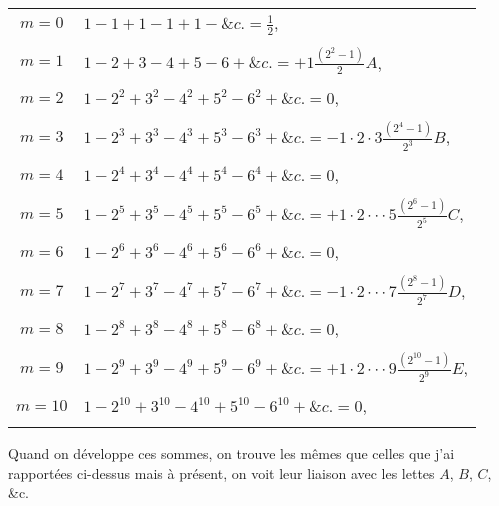 \documentclass[12pt]{article}
\theoremstyle{definition}
\begin{document}
\begin{center}
\begin{tabular}{ c|l }
$m=0$ & $1 - 1 + 1 - 1 + 1 - \&c. = \frac{1}{2}$, \\ & \\
$m=1$ & $1 - 2 + 3 - 4 + 5 - 6 + \&c. = +1\frac{(2^2 - 1)}{2}A$, \\ & \\
$m=2$ & $1 - 2^2 + 3^2 - 4^2 + 5^2 - 6^2 + \&c. = 0$, \\ & \\
$m=3$ & $1 - 2^3 + 3^3 - 4^3 + 5^3 - 6^3 + \&c. = -1\cdot 2 \cdot 3\frac{(2^4 - 1)}{2^3}B$, \\ & \\
$m=4$ & $1 - 2^4 + 3^4 - 4^4 + 5^4 - 6^4 + \&c. = 0$, \\ & \\
$m=5$ & $1 - 2^5 + 3^5 - 4^5 + 5^5 - 6^5 + \&c. = +1\cdot 2 \cdot \cdot \cdot 5\frac{(2^6 - 1)}{2^5}C$, \\ & \\
$m=6$ & $1 - 2^6 + 3^6 - 4^6 + 5^6 - 6^6 + \&c. = 0$, \\ & \\
$m=7$ & $1 - 2^7 + 3^7 - 4^7 + 5^7 - 6^7 + \&c. = -1\cdot 2 \cdot \cdot \cdot 7\frac{(2^8 - 1)}{2^7}D$, \\ & \\
$m=8$ & $1 - 2^8 + 3^8 - 4^8 + 5^8 - 6^8 + \&c. = 0$, \\ & \\
$m=9$ & $1 - 2^9 + 3^9 - 4^9 + 5^9 - 6^9 + \&c. = +1\cdot 2 \cdot \cdot \cdot 9\frac{(2^{10} - 1)}{2^9}E$, \\ & \\
$m=10$ & $1 - 2^{10} + 3^{10} - 4^{10} + 5^{10} - 6^{10} + \&c. = 0$, \\ & \\
\end{tabular}
\end{center}
Quand on développe ces sommes, on trouve les mêmes que celles que j'ai rapportées ci-dessus mais à présent, on voit leur liaison avec les lettes $A$, $B$, $C$, \&c.
\end{document}
